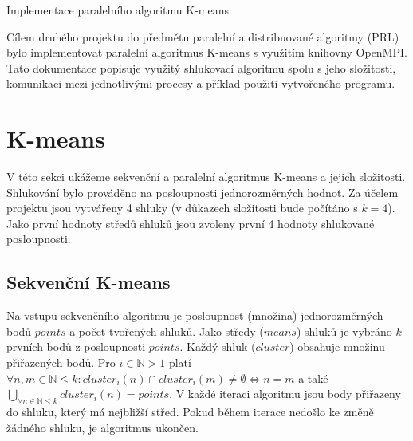 \documentclass[a4paper, 11pt, fleqn]{scrartcl}
\newcommand{\NAZEV}{Implementace paralelního algoritmu K-means}
\begin{document}
  \begin{center}
    {\Large \NAZEV}
  \end{center}

  Cílem druhého projektu do předmětu paralelní a distribuované algoritmy (PRL) bylo implementovat paralelní algoritmus K-means s využitím knihovny OpenMPI. Tato dokumentace popisuje využitý shlukovací algoritmu spolu s jeho složitosti, komunikaci mezi jednotlivými procesy a příklad použití vytvořeného programu.

  \section{K-means}
    V této sekci ukážeme sekvenční a paralelní algoritmus K-means a jejich složitosti. Shlukování bylo prováděno na posloupnosti jednorozměrných hodnot. Za účelem projektu jsou vytvářeny 4 shluky (v důkazech složitosti bude počítáno s $k = 4$). Jako první hodnoty středů shluků jsou zvoleny první 4 hodnoty shlukované posloupnosti.

    \subsection{Sekvenční K-means}

      Na vstupu sekvenčního algoritmu je posloupnost (množina) jednorozměrných bodů $points$ a počet tvořených shluků. Jako středy ($means$) shluků je vybráno $k$ prvních bodů z posloupnosti $points$. Každý shluk ($cluster$) obsahuje množinu přiřazených bodů. Pro $i \in \mathbb{N} > 1$ platí $\forall n, m \in \mathbb{N} \leq k: cluster_i(n) \cap cluster_i(m) \neq \emptyset \iff n = m$ a také $\bigcup_{\forall n \in \mathbb{N} \leq k} cluster_i(n) = points$. V každé iteraci algoritmu jsou body přiřazeny do shluku, který má nejbližší střed. Pokud během iterace nedošlo ke změně žádného shluku, je algoritmus ukončen.
\end{document}

